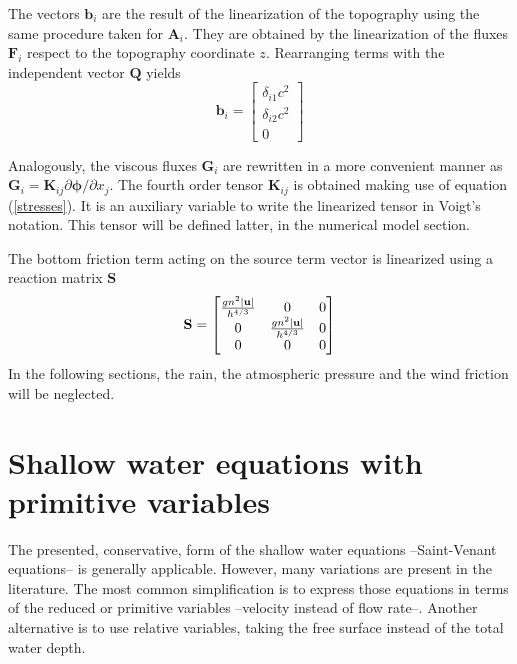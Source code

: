 The vectors $\mathbf{b}_i$ are the result of the linearization of the topography using the same procedure taken for $\mathbf{A}_i$. They are obtained by the linearization of the fluxes $\mathbf{F}_i$ respect to the topography coordinate $z$. Rearranging terms with the independent vector $\mathbf{Q}$ yields
\begin{equation}
    \mathbf{b}_i = \left[\begin{matrix}
        \delta_{i1} c^2 \\
        \delta_{i2} c^2 \\
        0
    \end{matrix}\right]
\end{equation}


Analogously, the viscous fluxes $\mathbf{G}_i$ are rewritten in a more convenient manner as ${\mathbf{G}_i = \mathbf{K}_{ij} \partial\bm{\phi}/\partial x_j}$. The fourth order tensor $\mathbf{K}_{ij}$ is obtained making use of equation (\ref{stresses}). It is an auxiliary variable to write the linearized tensor in Voigt's notation. This tensor will be defined latter, in the numerical model section.




The bottom friction term acting on the source term vector is linearized using a reaction matrix $\mathbf{S}$
\begin{equation}
\mathbf{S} = \left[\begin{matrix}
    \frac{gn^2\lvert\mathbf{u}\rvert}{h^{4/3}} & 0 & 0 \\
    0 & \frac{gn^2\lvert\mathbf{u}\rvert}{h^{4/3}} & 0 \\
    0 & 0 & 0
\end{matrix}\right]
\end{equation}
In the following sections, the rain, the atmospheric pressure and the wind friction will be neglected.







\section{Shallow water equations with primitive variables}


The presented, conservative, form of the shallow water equations --Saint-Venant equations-- is generally applicable. However, many variations are present in the literature.
The most common simplification is to express those equations in terms of the reduced or primitive variables --velocity instead of flow rate--.
Another alternative is to use relative variables, taking the free surface instead of the total water depth.

